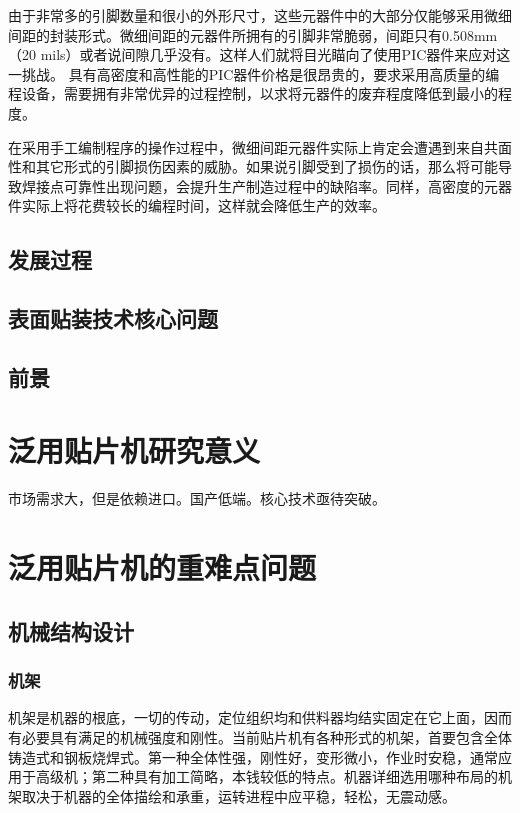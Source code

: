 \documentclass[a4paper]{article}%
\begin{document}
\begin{CJK}{UTF8}{gbsn}
由于非常多的引脚数量和很小的外形尺寸，这些元器件中的大部分仅能够采用微细间距的封装形式。微细间距的元器件所拥有的引脚非常脆弱，间距只有0.508mm（20 mils）或者说间隙几乎没有。这样人们就将目光瞄向了使用PIC器件来应对这一挑战。 具有高密度和高性能的PIC器件价格是很昂贵的，要求采用高质量的编程设备，需要拥有非常优异的过程控制，以求将元器件的废弃程度降低到最小的程度。

在采用手工编制程序的操作过程中，微细间距元器件实际上肯定会遭遇到来自共面性和其它形式的引脚损伤因素的威胁。如果说引脚受到了损伤的话，那么将可能导致焊接点可靠性出现问题，会提升生产制造过程中的缺陷率。同样，高密度的元器件实际上将花费较长的编程时间，这样就会降低生产的效率。
\subsection{发展过程}
\subsection{表面贴装技术核心问题}
\subsection{前景}
\section{泛用贴片机研究意义}
市场需求大，但是依赖进口。国产低端。核心技术亟待突破。
\section{泛用贴片机的重难点问题}
\subsection{机械结构设计}
\subsubsection{机架}
机架是机器的根底，一切的传动，定位组织均和供料器均结实固定在它上面，因而有必要具有满足的机械强度和刚性。当前贴片机有各种形式的机架，首要包含全体铸造式和钢板烧焊式。第一种全体性强，刚性好，变形微小，作业时安稳，通常应用于高级机；第二种具有加工简略，本钱较低的特点。机器详细选用哪种布局的机架取决于机器的全体描绘和承重，运转进程中应平稳，轻松，无震动感。


\end{CJK}
\end{document}
